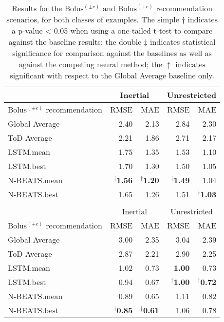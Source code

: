 \begin{table*}[t]\setlength{\tabcolsep}{4pt}
\caption{Results for the Bolus$^{(\pm c)}$ and Bolus$^{(+c)}$ recommendation scenarios, for both classes of examples. The simple $\dagger$ indicates a p-value < 0.05 when using a one-tailed t-test to compare against the baseline results; the double $\ddagger$ indicates statistical significance for comparison against the baselines as well as against the competing neural method; the $\uparrow$ indicates significant with respect to the Global Average baseline only.}
\begin{center}
\label{tab:bolus_results}
\small
\begin{tabular}{|l|rr|rr|}
   	\cline{2-5}
	\multicolumn{1}{c}{} & \multicolumn{2}{|c|}{Inertial} & \multicolumn{2}{c|}{Unrestricted}\\
	\hline
	Bolus$^{(\pm c)}$ recommendation & RMSE & MAE & RMSE & MAE\\
	\hline
	Global Average & 2.40 & 2.13 & 2.84 & 2.30\\
	ToD Average & 2.21 & 1.86 & 2.71 & 2.17\\
	\hline
	LSTM.mean & 1.75 & 1.35 & 1.53 & 1.10\\
	LSTM.best & 1.70 & 1.30 & 1.50 & 1.05\\
	\hline
	N-BEATS.mean & $^\dagger${\bf 1.56} & $^\ddagger${\bf 1.20} & $^\dagger${\bf 1.49} & 1.04\\
	N-BEATS.best & 1.65 & 1.26 & 1.51 & $^\dagger${\bf 1.03}\\
	\hline
	\multicolumn{5}{c}{}\\[-1.5ex]
	\cline{2-5}
	\multicolumn{1}{c}{} & \multicolumn{2}{|c|}{Inertial} & \multicolumn{2}{c|}{Unrestricted}\\
	\hline
	Bolus$^{(+c)}$ recommendation & RMSE & MAE & RMSE & MAE\\
	\hline
	Global Average & 3.00 & 2.35 & 3.04 & 2.39\\
	ToD Average & 2.87 & 2.21 & 2.90 & 2.25\\
	\hline
	LSTM.mean & 1.02 & 0.73 & {\bf 1.00} & 0.73\\
	LSTM.best & 0.94 & 0.67 & $^\dagger${\bf 1.00} & $^\dagger${\bf 0.72}\\
	\hline
	N-BEATS.mean & 0.89 & 0.65 & 1.11 & 0.82\\
	N-BEATS.best & $^\dagger${\bf 0.85} & $^\dagger${\bf 0.61} & 1.06 & 0.78\\
	\hline
\end{tabular}
\end{center}
\end{table*}



